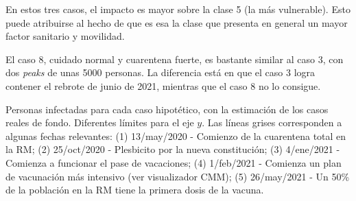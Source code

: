 En estos tres casos, el impacto es mayor sobre la clase 5 (la más vulnerable). Esto puede atribuirse al hecho de que es esa la clase que presenta en general un mayor factor sanitario y movilidad.

El caso 8, cuidado normal y cuarentena fuerte, es bastante similar al caso 3, con dos \textit{peaks} de unas 5000 personas. La diferencia está en que el caso 3 logra contener el rebrote de junio de 2021, mientras que el caso 8 no lo consigue.

\begin{images}[\label{img:hip-3478-I-comp}]{Personas infectadas para cada caso hipotético, con la estimación de los casos reales de fondo. Diferentes límites para el eje \(y\). Las líneas grises corresponden a algunas fechas relevantes: (1) 13/may/2020 - Comienzo de la cuarentena total en la RM; (2) 25/oct/2020 - Plesbicito por la nueva constitución; (3) 4/ene/2021 - Comienza a funcionar el pase de vacaciones; (4) 1/feb/2021 - Comienza un plan de vacunación más intensivo (ver visualizador CMM); (5) 26/may/2021 - Un 50\% de la población en la RM tiene la primera dosis de la vacuna.}
\end{images}


